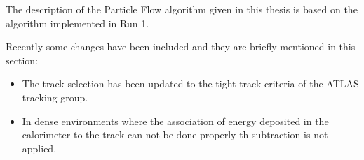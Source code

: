 The description of the Particle Flow algorithm given in this thesis is based on the algorithm implemented in Run 1.

Recently some changes have been included and they are briefly mentioned in this section:

\begin{itemize}
\item The track selection has been updated to the tight track criteria of the ATLAS tracking group.
\item In dense environments where the association of energy deposited in the calorimeter to the track can not be done properly th subtraction is not applied.

\end{itemize}


